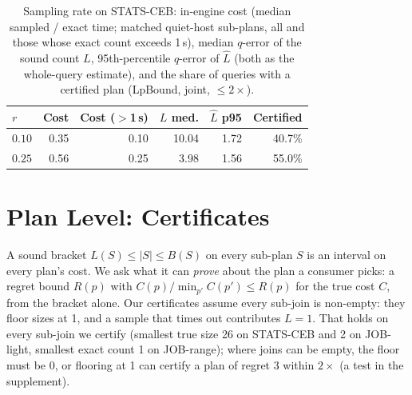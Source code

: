 \documentclass[sigconf, nonacm]{acmart}
\begin{document}
\begin{table}[t]
\centering
\caption{Sampling rate on STATS-CEB: in-engine cost (median sampled / exact
time; matched quiet-host sub-plans, all and those whose exact count exceeds
1\,s), median $q$-error of the sound count $L$, 95th-percentile $q$-error of
$\hat L$ (both as the whole-query estimate), and the share of queries with a
certified plan (LpBound, joint, $\le2\times$).}
\label{tab:rate}
\footnotesize
\setlength{\tabcolsep}{3pt}
\begin{tabular}{@{}lrrrrr@{}}
\toprule
$r$ & Cost & Cost ($>$1\,s) & $L$ med. & $\hat L$ p95 & Certified \\ \midrule
$0.10$ & 0.35 & 0.10 & 10.04 & 1.72 & 40.7\% \\
$0.25$ & 0.56 & 0.25 & 3.98 & 1.56 & 55.0\% \\
\bottomrule
\end{tabular}
\end{table}

\section{Plan Level: Certificates}
\label{sec:certificates}

A sound bracket $L(S)\le|S|\le B(S)$ on every sub-plan $S$ is an interval on
every plan's cost. We ask what it can \emph{prove} about the plan a consumer
picks: a regret bound $R(p)$ with $C(p)/\min_{p'}C(p')\le R(p)$ for the true
cost $C$, from the bracket alone. Our certificates assume every sub-join is
non-empty: they floor sizes at 1, and a sample that times out contributes
$L{=}1$. That holds on every sub-join we certify (smallest true size 26 on
STATS-CEB and 2 on JOB-light, smallest exact count 1 on JOB-range); where joins can be empty, the floor
must be 0, or flooring at 1 can certify a plan of regret 3 within $2\times$ (a
test in the supplement).
\end{document}
